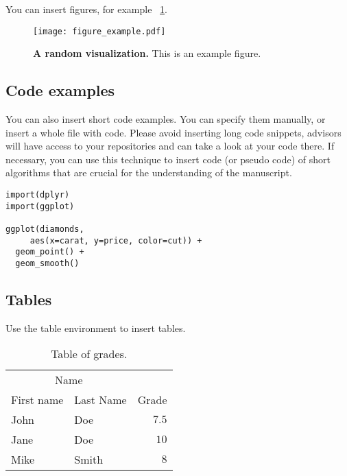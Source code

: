 \documentclass[fleqn,oneauthor,9pt]{ds_report}
\begin{document}
You can insert figures, for example \figurename~\ref{fig:column}.

\begin{figure}[ht]\centering
  \texttt{[image: figure\_example.pdf]}
  \caption{\textbf{A random visualization.} This is an example figure.}
  \label{fig:column}
\end{figure}

\subsection*{Code examples}

You can also insert short code examples. You can specify them manually, or insert a whole file with code. Please avoid inserting long code snippets, advisors will have access to your repositories and can take a look at your code there. If necessary, you can use this technique to insert code (or pseudo code) of short algorithms that are crucial for the understanding of the manuscript.

\lstset{language=Python}


\lstset{language=R}
\begin{lstlisting}
import(dplyr)
import(ggplot)

ggplot(diamonds,
     aes(x=carat, y=price, color=cut)) +
  geom_point() +
  geom_smooth()
\end{lstlisting}


\subsection*{Tables}

Use the table environment to insert tables.

\begin{table}[hbt]
  \caption{Table of grades.}
  \centering
  \begin{tabular}{l l | r}
    \toprule
    \multicolumn{2}{c}{Name} \\
    \cmidrule(r){1-2}
    First name & Last Name & Grade \\
    \midrule
    John & Doe & $7.5$ \\
    Jane & Doe & $10$ \\
    Mike & Smith & $8$ \\
    \bottomrule
  \end{tabular}
  \label{tab:label}
\end{table}
\end{document}
